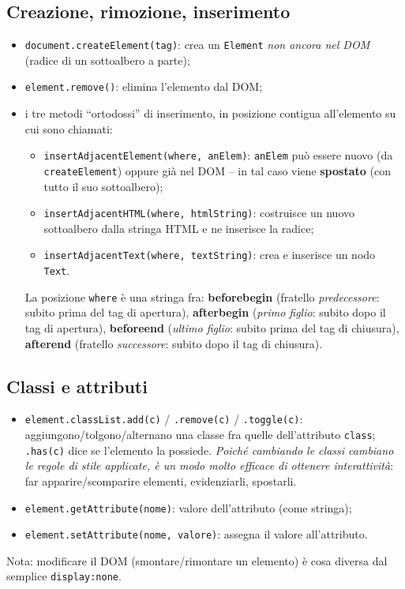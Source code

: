 \subsection{Creazione, rimozione, inserimento}
\begin{itemize}
  \item \texttt{document.createElement(tag)}: crea un \texttt{Element} \emph{non ancora nel
        DOM} (radice di un sottoalbero a parte);
  \item \texttt{element.remove()}: elimina l'elemento dal DOM;
  \item i tre metodi ``ortodossi'' di inserimento, in posizione contigua all'elemento su cui
        sono chiamati:
        \begin{itemize}
          \item \texttt{insertAdjacentElement(where, anElem)}: \texttt{anElem} pu\`o essere
                nuovo (da \texttt{createElement}) oppure gi\`a nel DOM -- in tal caso viene
                \textbf{spostato} (con tutto il suo sottoalbero);
          \item \texttt{insertAdjacentHTML(where, htmlString)}: costruisce un nuovo
                sottoalbero dalla stringa HTML e ne inserisce la radice;
          \item \texttt{insertAdjacentText(where, textString)}: crea e inserisce un nodo
                \texttt{Text}.
        \end{itemize}
        La posizione \texttt{where} \`e una stringa fra:
        \textbf{beforebegin} (fratello \emph{predecessore}: subito prima del tag di apertura),
        \textbf{afterbegin} (\emph{primo figlio}: subito dopo il tag di apertura),
        \textbf{beforeend} (\emph{ultimo figlio}: subito prima del tag di chiusura),
        \textbf{afterend} (fratello \emph{successore}: subito dopo il tag di chiusura).
\end{itemize}

\subsection{Classi e attributi}
\begin{itemize}
  \item \texttt{element.classList.add(c)} / \texttt{.remove(c)} / \texttt{.toggle(c)}:
        aggiungono/tolgono/alternano una classe fra quelle dell'attributo \texttt{class};
        \texttt{.has(c)} dice se l'elemento la possiede.
        \emph{Poich\'e cambiando le classi cambiano le regole di stile applicate, \`e un modo
        molto efficace di ottenere interattivit\`a}: far apparire/scomparire elementi,
        evidenziarli, spostarli.
  \item \texttt{element.getAttribute(nome)}: valore dell'attributo (come stringa);
  \item \texttt{element.setAttribute(nome, valore)}: assegna il valore all'attributo.
\end{itemize}
Nota: modificare il DOM (smontare/rimontare un elemento) \`e cosa diversa dal semplice
\texttt{display:none}.

